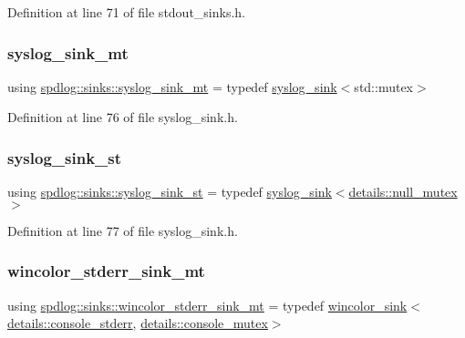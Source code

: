 Definition at line 71 of file stdout\+\_\+sinks.\+h.

\mbox{\label{namespacespdlog_1_1sinks_a6674644a4ab8a7579e45bd79dc107a70}} 
\subsubsection{\texorpdfstring{syslog\+\_\+sink\+\_\+mt}{syslog\_sink\_mt}}
{\footnotesize\ttfamily using \hyperlink{namespacespdlog_1_1sinks_a6674644a4ab8a7579e45bd79dc107a70}{spdlog\+::sinks\+::syslog\+\_\+sink\+\_\+mt} = typedef \hyperlink{classspdlog_1_1sinks_1_1syslog__sink}{syslog\+\_\+sink}$<$std\+::mutex$>$}



Definition at line 76 of file syslog\+\_\+sink.\+h.

\mbox{\label{namespacespdlog_1_1sinks_a83f4d6616a2fbf3473a6a979647b5139}} 
\subsubsection{\texorpdfstring{syslog\+\_\+sink\+\_\+st}{syslog\_sink\_st}}
{\footnotesize\ttfamily using \hyperlink{namespacespdlog_1_1sinks_a83f4d6616a2fbf3473a6a979647b5139}{spdlog\+::sinks\+::syslog\+\_\+sink\+\_\+st} = typedef \hyperlink{classspdlog_1_1sinks_1_1syslog__sink}{syslog\+\_\+sink}$<$\hyperlink{structspdlog_1_1details_1_1null__mutex}{details\+::null\+\_\+mutex}$>$}



Definition at line 77 of file syslog\+\_\+sink.\+h.

\mbox{\label{namespacespdlog_1_1sinks_a44bdf82d709a56703eb208cd584529e5}} 
\subsubsection{\texorpdfstring{wincolor\+\_\+stderr\+\_\+sink\+\_\+mt}{wincolor\_stderr\_sink\_mt}}
{\footnotesize\ttfamily using \hyperlink{namespacespdlog_1_1sinks_a44bdf82d709a56703eb208cd584529e5}{spdlog\+::sinks\+::wincolor\+\_\+stderr\+\_\+sink\+\_\+mt} = typedef \hyperlink{classspdlog_1_1sinks_1_1wincolor__sink}{wincolor\+\_\+sink}$<$\hyperlink{structspdlog_1_1details_1_1console__stderr}{details\+::console\+\_\+stderr}, \hyperlink{structspdlog_1_1details_1_1console__mutex}{details\+::console\+\_\+mutex}$>$}




